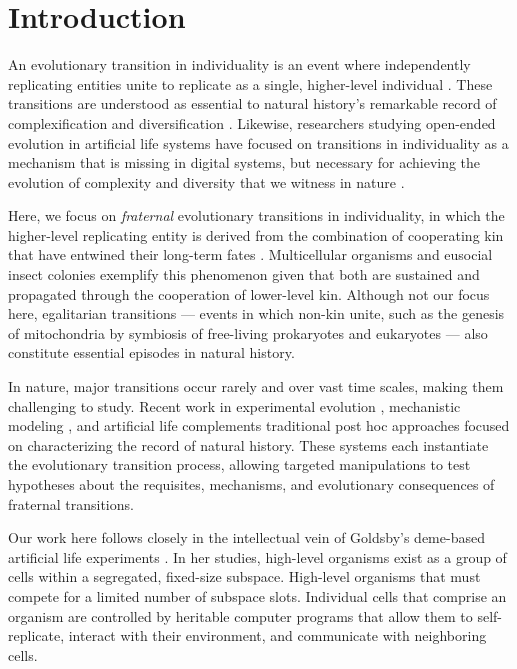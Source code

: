 \section{Introduction}

An evolutionary transition in individuality is an event where independently replicating entities unite to replicate as a single, higher-level individual \citep{smith1997major}.
These transitions are understood as essential to natural history's remarkable record of complexification and diversification \citep{smith1997major}.
Likewise, researchers studying open-ended evolution in artificial life systems have focused on transitions in individuality as a mechanism that is missing in digital systems, but necessary for achieving the evolution of complexity and diversity that we witness in nature \citep{taylor2016open, banzhaf2016defining}.

Here, we focus on \textit{fraternal} evolutionary transitions in individuality, in which the higher-level replicating entity is derived from the combination of cooperating kin that have entwined their long-term fates \citep{west2015major}.
Multicellular organisms and eusocial insect colonies exemplify this phenomenon \citep{smith1997major} given that both are sustained and propagated through the cooperation of lower-level kin.
Although not our focus here, egalitarian transitions --- events in which non-kin unite, such as the genesis of mitochondria by symbiosis of free-living prokaryotes and eukaryotes \citep{smith1997major} --- also constitute essential episodes in natural history.

In nature, major transitions occur rarely and over vast time scales, making them challenging to study.
Recent work in experimental evolution \citep{ratcliff2014experimental, ratcliff2015origins, gulli2019evolution, koschwanez2013improved}, mechanistic modeling \citep{hanschen2015evolutionary, staps2019emergence}, and artificial life \citep{goldsby2012task, goldsby2014evolutionary} complements traditional post hoc approaches focused on characterizing the record of natural history.
These systems each instantiate the evolutionary transition process, allowing targeted manipulations to test hypotheses about the requisites, mechanisms, and evolutionary consequences of fraternal transitions.

Our work here follows closely in the intellectual vein of Goldsby's deme-based artificial life experiments \citep{goldsby2012task, goldsby2014evolutionary}.
In her studies, high-level organisms exist as a group of cells within a segregated, fixed-size subspace.
High-level organisms that must compete for a limited number of subspace slots.
Individual cells that comprise an organism are controlled by heritable computer programs that allow them to self-replicate, interact with their environment, and communicate with neighboring cells.

